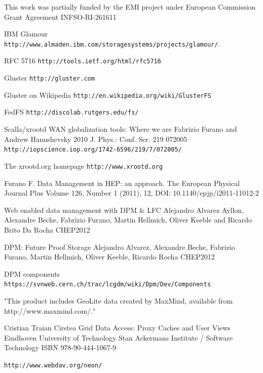 \documentclass[12pt]{article} %
\begin{document}
This work was partially funded by the EMI project under European
Commission Grant Agreement INFSO-RI-261611



\begin{thebibliography}{9}

 IBM Glamour \lstinline"http://www.almaden.ibm.com/storagesystems/projects/glamour/". 


 RFC 5716
\lstinline"http://tools.ietf.org/html/rfc5716"


 Gluster
\lstinline"http://gluster.com"

 Gluster on Wikipedia
\lstinline"http://en.wikipedia.org/wiki/GlusterFS"


 FedFS
\lstinline"http://discolab.rutgers.edu/fs/"

 Scalla/xrootd WAN globalization tools: Where we are
Fabrizio Furano and Andrew Hanushevsky 2010 J. Phys.: Conf. Ser. 219 072005
\lstinline"http://iopscience.iop.org/1742-6596/219/7/072005/"

 The xrootd.org homepage
\lstinline"http://www.xrootd.org"

Furano F. Data Management in HEP: an approach. 
The European Physical Journal Plus
Volume 126, Number 1 (2011), 12, DOI: 10.1140/epjp/i2011-11012-2

Web enabled data management with DPM \& LFC
Alejandro Alvarez Ayllon, Alexandre Beche, Fabrizio Furano, Martin Hellmich, Oliver Keeble and Ricardo Brito Da Rocha
CHEP2012

DPM: Future Proof Storage
Alejandro Alvarez, Alexandre Beche, Fabrizio Furano, Martin Hellmich, Oliver Keeble, Ricardo Rocha
CHEP2012

 DPM components
\lstinline"https://svnweb.cern.ch/trac/lcgdm/wiki/Dpm/Dev/Components"

"This product includes GeoLite data created by MaxMind, available from http://www.maxmind.com/."

Cristian Traian Cirstea
Grid Data Access: Proxy Caches and User Views
Eindhoven University of Technology
Stan Ackermans Institute / Software Technology
ISBN 978-90-444-1067-9


\lstinline"http://www.webdav.org/neon/"

\end{thebibliography}
\end{document}
